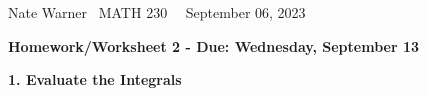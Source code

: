 \documentclass{report}
\title{\Huge{}}
\author{\huge{Nathan Warner}}
\date{\huge{}}
\begin{document}
    \pagebreak \bigbreak \noindent
    Nate Warner \ \quad \quad \quad \quad \quad \quad \quad \quad \quad \quad \quad \quad \quad \quad \quad \quad \quad  MATH 230 \quad  \quad \quad \quad \quad \quad \quad \quad \quad \ \ \quad \quad September 06, 2023
    \begin{center}
        \textbf{Homework/Worksheet 2 - Due: Wednesday, September 13}
    \end{center}
    
    


    \bigbreak \noindent \bigbreak \noindent 
    \textbf{1. Evaluate the Integrals}
    \bigbreak \noindent 
\end{document}
